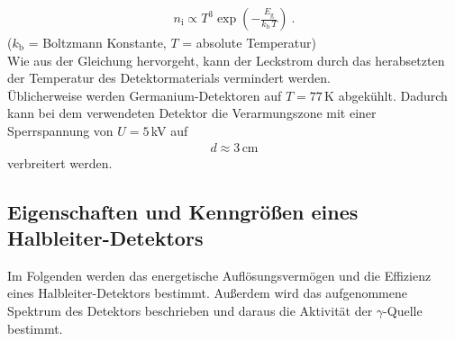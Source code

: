 \begin{align}
	n_\text{i} \propto T^3 \exp\left(-\frac{E_\text{g}}{k_\text{b}\,T} \right) \ .
\end{align}
\hfil {\footnotesize($k_\text{b}$ = Boltzmann Konstante, $T$ = absolute Temperatur)} \hfil \\
Wie aus der Gleichung hervorgeht, kann der Leckstrom durch das herabsetzten der Temperatur des Detektormaterials vermindert werden. \\
Üblicherweise werden Germanium-Detektoren auf $T = 77$\,K abgekühlt. Dadurch kann bei dem verwendeten Detektor die Verarmungszone mit einer Sperrspannung von $U = 5$\,kV auf
\begin{align}
	d \approx 3\,\text{cm}
\end{align}
verbreitert werden.



\subsection{Eigenschaften und Kenngrößen eines Halbleiter-Detektors}
Im Folgenden werden das energetische Auflösungsvermögen und die Effizienz eines Halbleiter-Detektors bestimmt. Außerdem wird das aufgenommene Spektrum des Detektors beschrieben und daraus die Aktivität der $\gamma$-Quelle bestimmt.




